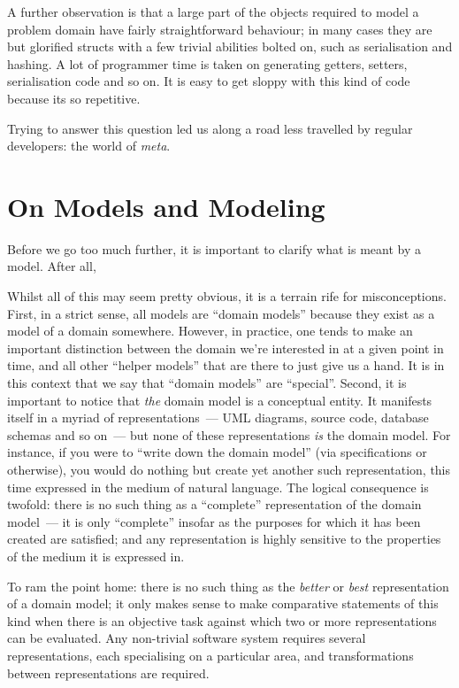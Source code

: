 \documentclass{book}
\begin{document}
A further observation is that a large part of the objects required to
model a problem domain have fairly straightforward behaviour; in many
cases they are but glorified structs with a few trivial abilities
bolted on, such as serialisation and hashing. A lot of programmer time
is taken on generating getters, setters, serialisation code and so
on. It is easy to get sloppy with this kind of code because its so
repetitive.

Trying to answer this question led us along a road less travelled by
regular developers: the world of \emph{meta}.

\section{On Models and Modeling}

Before we go too much further, it is important to clarify what is
meant by a model. After all,

Whilst all of this may seem pretty obvious, it is a terrain rife for
misconceptions. First, in a strict sense, all models are ``domain
models'' because they exist as a model of a domain somewhere. However,
in practice, one tends to make an important distinction between the
domain we're interested in at a given point in time, and all other
``helper models'' that are there to just give us a hand. It is in this
context that we say that ``domain models'' are ``special''. Second, it
is important to notice that \emph{the} domain model is a conceptual
entity. It manifests itself in a myriad of representations~--- UML
diagrams, source code, database schemas and so on~--- but none of
these representations \emph{is} the domain model. For instance, if you
were to ``write down the domain model'' (via specifications or
otherwise), you would do nothing but create yet another such
representation, this time expressed in the medium of natural
language. The logical consequence is twofold: there is no such thing
as a ``complete'' representation of the domain model~--- it is only
``complete'' insofar as the purposes for which it has been created are
satisfied; and any representation is highly sensitive to the
properties of the medium it is expressed in.

To ram the point home: there is no such thing as the \emph{better} or
\emph{best} representation of a domain model; it only makes sense to
make comparative statements of this kind when there is an objective
task against which two or more representations can be evaluated. Any
non-trivial software system requires several representations, each
specialising on a particular area, and transformations between
representations are required.
\end{document}
